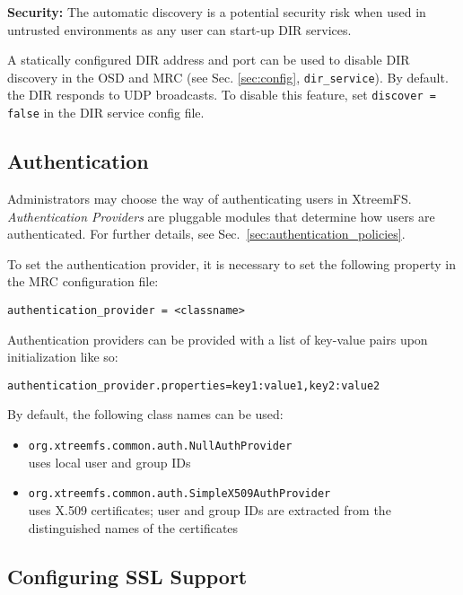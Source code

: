 \documentclass[a4paper,10pt]{book}
\begin{document}
\textbf{Security:} The automatic discovery is a potential security risk when used in untrusted environments as any user can start-up DIR services.

A statically configured DIR address and port can be used to disable DIR discovery in the OSD and MRC (see Sec. \ref{sec:config}, \texttt{dir\_service}). By default. the DIR responds to UDP broadcasts. To disable this feature, set  \texttt{discover = false} in the DIR service config file.


\subsection{Authentication}
\label{sec:AuthProvider}
Administrators may choose the way of authenticating users in XtreemFS. \emph{Authentication Providers} are pluggable modules that determine how users are authenticated. For further details, see Sec.\ \ref{sec:authentication_policies}.

To set the authentication provider, it is necessary to set the following property in the MRC configuration file:

\begin{verbatim}
authentication_provider = <classname>
\end{verbatim}

Authentication providers can be provided with a list of key-value pairs upon initialization like so:

\begin{verbatim}
authentication_provider.properties=key1:value1,key2:value2
\end{verbatim}

By default, the following class names can be used:

\begin{itemize}
 \item \texttt{org.xtreemfs.common.auth.NullAuthProvider}\\
uses local user and group IDs
 \item \texttt{org.xtreemfs.common.auth.SimpleX509AuthProvider}\\
uses X.509 certificates; user and group IDs are extracted from the distinguished names of the certificates
\end{itemize}


\subsection{Configuring SSL Support}
\label{sec:cfg_ssl}
\end{document}
